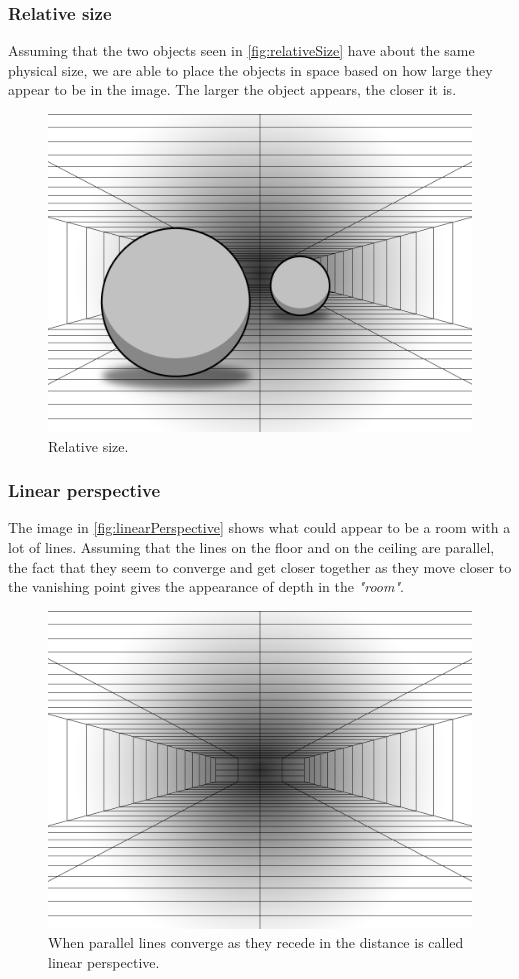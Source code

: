 \subsubsection{Relative size}
Assuming that the two objects seen in \autoref{fig:relativeSize} have about the same physical size, we are able to place the objects in space based on how large they appear to be in the image. The larger the object appears, the closer it is\citep{sensationPerception}.
\begin{figure}[H]
	\centering
	\includegraphics[width=0.8\linewidth]{figure/Analysis/relativeSize.png}
	\caption{Relative size.}
	\label{fig:relativeSize}
\end{figure}

\subsubsection{Linear perspective}
The image in \autoref{fig:linearPerspective} shows what could appear to be a room with a lot of lines. Assuming that the lines on the floor and on the ceiling are parallel, the fact that they seem to converge and get closer together as they move closer to the vanishing point gives the appearance of depth in the \textit{"room"}\citep{sensationPerception}.
\begin{figure}[H]
	\centering
	\includegraphics[width=0.8\linewidth]{figure/Analysis/linearPerspective.png}
	\caption{When parallel lines converge as they recede in the distance is called linear perspective.}
	\label{fig:linearPerspective}
\end{figure}

